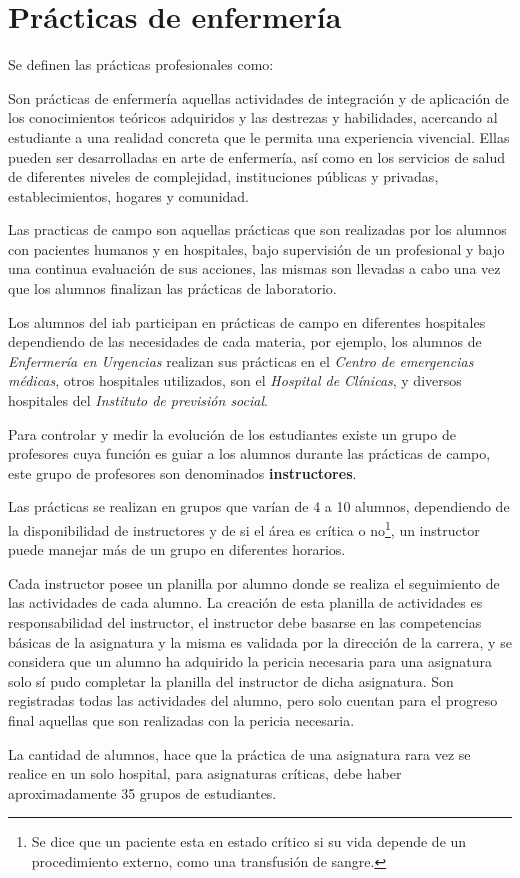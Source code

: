 \section{Prácticas de enfermería}
\label{sec:practica_hos}

Se definen las prácticas profesionales como\cite{iab:est_enfemeria}:

\begin{displayquote}

Son prácticas de enfermería aquellas actividades de integración y de aplicación
de los conocimientos teóricos adquiridos y las destrezas y habilidades,
acercando al estudiante a una realidad concreta que le permita una experiencia
vivencial. Ellas pueden ser desarrolladas en arte de enfermería, así como en los
servicios de salud de diferentes niveles de complejidad, instituciones públicas
y privadas, establecimientos, hogares y comunidad.

\end{displayquote}

Las practicas de campo son aquellas prácticas que son realizadas por los alumnos
con pacientes humanos y en hospitales, bajo supervisión de un profesional y bajo
una continua evaluación de sus acciones, las mismas son llevadas a cabo una vez
que los alumnos finalizan las prácticas de laboratorio.

Los alumnos del \Gls{iab} participan en prácticas de campo en diferentes
hospitales dependiendo de las necesidades de cada materia, por ejemplo, los
alumnos de \textit{Enfermería en Urgencias} realizan sus prácticas en el
\textit{Centro de emergencias médicas}, otros hospitales utilizados, son el
\textit{Hospital de Clínicas}, y diversos hospitales del \textit{Instituto de
    previsión social}.

Para controlar y medir la evolución de los estudiantes existe un grupo de
profesores cuya función es guiar a los alumnos durante las prácticas de campo,
este grupo de profesores son denominados \textbf{instructores}.

Las prácticas se realizan en grupos que varían de 4 a 10 alumnos, dependiendo de
la disponibilidad de instructores y de si el área es crítica o no\footnote{Se
    dice que un paciente esta en estado crítico si su vida depende de un
    procedimiento externo, como una transfusión de sangre.}, un instructor puede
manejar más de un grupo en diferentes horarios. 

Cada instructor posee un planilla por alumno donde se realiza el seguimiento de
las actividades de cada alumno. La creación de esta planilla de actividades es
responsabilidad del instructor, el instructor debe basarse en las competencias
básicas de la asignatura y la misma es validada por la dirección de la carrera,
y se considera que un alumno ha adquirido la pericia necesaria para una
asignatura solo sí pudo completar la planilla del instructor de dicha
asignatura. Son registradas todas las actividades del alumno, pero solo cuentan
para el progreso final aquellas que son realizadas con la pericia necesaria.

La cantidad de alumnos, hace que la práctica de una asignatura rara vez se
realice en un solo hospital, para asignaturas críticas, debe haber
aproximadamente 35 grupos de estudiantes.
